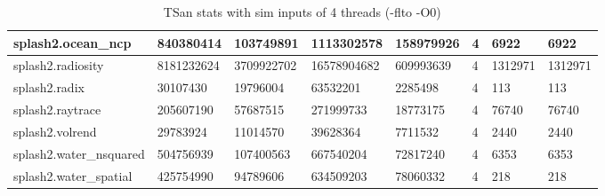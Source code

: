 \begin{table}[htbp]
{\begin{tabular}{|l|l|l|l|l|l|l|l|}
splash2.ocean\_ncp &  840380414 &  103749891 &  1113302578 &  158979926 &  4 &  6922 &  6922 \\ \hline
splash2.radiosity &  8181232624 &  3709922702 &  16578904682 &  609993639 &  4 &  1312971 &  1312971 \\ \hline
splash2.radix &  30107430 &  19796004 &  63532201 &  2285498 &  4 &  113 &  113 \\ \hline
splash2.raytrace &  205607190 &  57687515 &  271999733 &  18773175 &  4 &  76740 &  76740 \\ \hline
splash2.volrend &  29783924 &  11014570 &  39628364 &  7711532 &  4 &  2440 &  2440 \\ \hline
splash2.water\_nsquared &  504756939 &  107400563 &  667540204 &  72817240 &  4 &  6353 &  6353 \\ \hline
splash2.water\_spatial &  425754990 &  94789606 &  634509203 &  78060332 &  4 &  218 &  218 \\ \hline
\end{tabular}

}
\caption{TSan stats with sim inputs of 4 threads (-flto -O0) }
\end{table}


